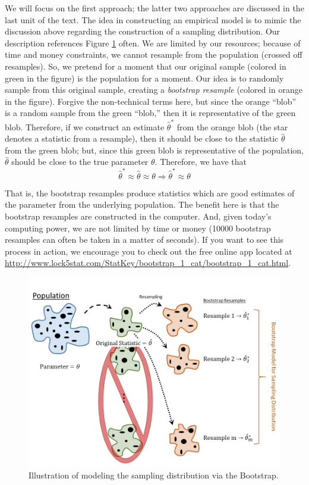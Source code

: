 \documentclass[]{book}
\theoremstyle{definition}
\theoremstyle{definition}
\theoremstyle{definition}
\theoremstyle{remark}
\begin{document}
We will focus on the first approach; the latter two approaches are
discussed in the last unit of the text. The idea in constructing an
empirical model is to mimic the discussion above regarding the
construction of a sampling distribution. Our description references
Figure \ref{fig:samplingdistns-bootstrap} often. We are limited by our
resources; because of time and money constraints, we cannot resample
from the population (crossed off resamples). So, we pretend for a moment
that our original sample (colored in green in the figure) is the
population for a moment. Our idea is to randomly sample from this
original sample, creating a \emph{bootstrap resample} (colored in orange
in the figure). Forgive the non-technical terms here, but since the
orange ``blob'' is a random sample from the green ``blob,'' then it is
representative of the green blob. Therefore, if we construct an estimate
\(\widehat{\theta}^*\) from the orange blob (the star denotes a
statistic from a resample), then it should be close to the statistic
\(\widehat{\theta}\) from the green blob; but, since this green blob is
representative of the population, \(\widehat{\theta}\) should be close
to the true parameter \(\theta\). Therefore, we have that \[
\widehat{\theta}^* \approx \widehat{\theta} \approx \theta \Rightarrow \widehat{\theta}^* \approx \theta
\]

That is, the bootstrap resamples produce statistics which are good
estimates of the parameter from the underlying population. The benefit
here is that the bootstrap resamples are constructed in the computer.
And, given today's computing power, we are not limited by time or money
(10000 bootstrap resamples can often be taken in a matter of seconds).
If you want to see this process in action, we encourage you to check out
the free online app located at
\url{http://www.lock5stat.com/StatKey/bootstrap_1_cat/bootstrap_1_cat.html}.

\begin{figure}

{\centering \includegraphics[width=0.8\linewidth]{./images/SamplingDistns-Bootstrap} 

}

\caption{Illustration of modeling the sampling distribution via the Bootstrap.}\label{fig:samplingdistns-bootstrap}
\end{figure}
\end{document}
